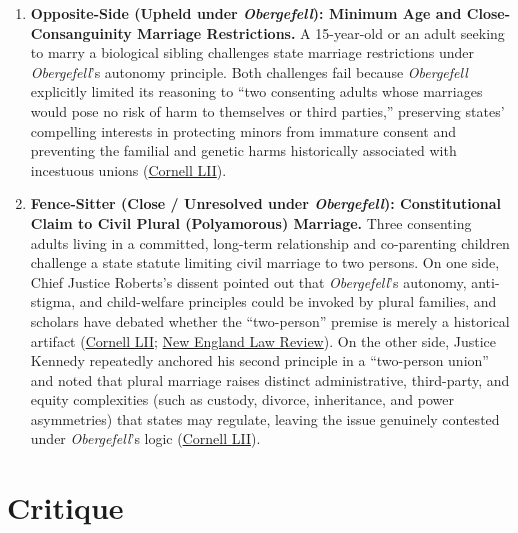 \documentclass[12pt]{article}
\begin{document}
\begin{enumerate}
    \item \textbf{Opposite-Side (Upheld under \textit{Obergefell}): Minimum Age and Close-Consanguinity Marriage Restrictions.} A 15-year-old or an adult seeking to marry a biological sibling challenges state marriage restrictions under \textit{Obergefell}'s autonomy principle. Both challenges fail because \textit{Obergefell} explicitly limited its reasoning to ``two consenting adults whose marriages would pose no risk of harm to themselves or third parties,'' preserving states' compelling interests in protecting minors from immature consent and preventing the familial and genetic harms historically associated with incestuous unions (\href{https://www.law.cornell.edu/supremecourt/text/14-556}{Cornell LII}).

    \item \textbf{Fence-Sitter (Close / Unresolved under \textit{Obergefell}): Constitutional Claim to Civil Plural (Polyamorous) Marriage.} Three consenting adults living in a committed, long-term relationship and co-parenting children challenge a state statute limiting civil marriage to two persons. On one side, Chief Justice Roberts's dissent pointed out that \textit{Obergefell}'s autonomy, anti-stigma, and child-welfare principles could be invoked by plural families, and scholars have debated whether the ``two-person'' premise is merely a historical artifact (\href{https://www.law.cornell.edu/supremecourt/text/14-556}{Cornell LII}; \href{https://newenglrev.com/2015/08/31/obergefell-and-the-future-of-plural-marriage/}{New England Law Review}). On the other side, Justice Kennedy repeatedly anchored his second principle in a ``two-person union'' and noted that plural marriage raises distinct administrative, third-party, and equity complexities (such as custody, divorce, inheritance, and power asymmetries) that states may regulate, leaving the issue genuinely contested under \textit{Obergefell}'s logic (\href{https://www.law.cornell.edu/supremecourt/text/14-556}{Cornell LII}).
\end{enumerate}

\section{Critique}
\end{document}
